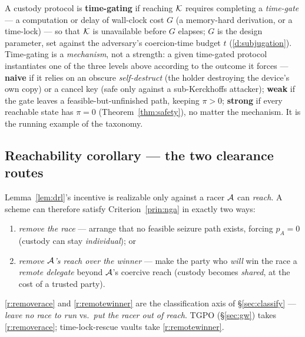 \begin{definition}\label{def:timegate}
A custody protocol is \textbf{time-gating} if reaching $\mathcal{K}$
requires completing a \emph{time-gate} --- a computation or delay of wall-clock
cost $G$ (a memory-hard derivation, or a time-lock) --- so that $\mathcal{K}$ is unavailable
before $G$ elapses; $G$ is the design parameter, set against the adversary's
coercion-time budget $t$ (\ref{d:subjugation}). Time-gating is a \emph{mechanism}, not a strength:
a given time-gated protocol instantiates one of the three levels above according
to the outcome it forces --- \textbf{naive} if it relies on an obscure
\emph{self-destruct} (the holder destroying the device's own copy) or a cancel
key (safe only against a sub-Kerckhoffs attacker); \textbf{weak} if the gate
leaves a feasible-but-unfinished path, keeping $\pi > 0$; \textbf{strong} if every
reachable state has $\pi = 0$ (Theorem~\ref{thm:safety}), no matter the mechanism.
It is the running example of the taxonomy.
\end{definition}

\subsection{Reachability corollary --- the two clearance routes}
\label{sub:reach}

\begin{corollary}[Reachability]\label{cor:reach}
Lemma~\ref{lem:drl}'s incentive is realizable only against a racer $\mathcal{A}$
can \emph{reach}. A scheme can therefore satisfy Criterion~\ref{prin:nga} in
exactly two ways:
\begin{enumerate}[nosep,leftmargin=2.6em,label=(R\arabic*),ref=R\arabic*,font=\normalfont\bfseries\color{accentdark}]
  \item\label{r:removerace} \emph{remove the race} --- arrange that no feasible seizure path
        exists, forcing $p_A = 0$ (custody can stay \emph{individual}); or
  \item\label{r:remotewinner} \emph{remove $\mathcal{A}$'s reach over the winner} --- make the party
        who \emph{will} win the race a \emph{remote delegate} beyond $\mathcal{A}$'s
        coercive reach (custody becomes \emph{shared}, at the cost of a trusted
        party).
\end{enumerate}
\end{corollary}

\noindent \ref{r:removerace} and \ref{r:remotewinner} are the classification axis of \S\ref{sec:classify} ---
\emph{leave no race to run} vs.\ \emph{put the racer out of reach}. TGPO
(\S\ref{sec:gw}) takes \ref{r:removerace}; time-lock-rescue vaults take \ref{r:remotewinner}.

